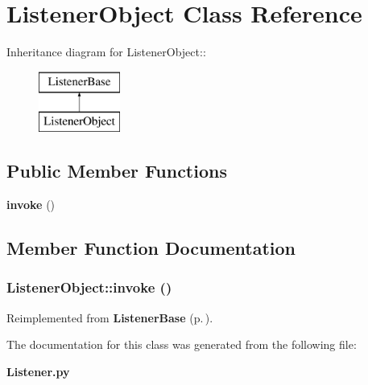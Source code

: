 \section{Listener\-Object Class Reference}
\label{classListenerObject}
Inheritance diagram for Listener\-Object::\begin{figure}[H]
\begin{center}
\leavevmode
\includegraphics[height=2cm]{classListenerObject}
\end{center}
\end{figure}
\subsection*{Public Member Functions}
\begin{CompactItemize}
\item 
{\bf invoke} ()
\end{CompactItemize}


\subsection{Member Function Documentation}
\subsubsection{\setlength{\rightskip}{0pt plus 5cm}Listener\-Object::invoke ()}\label{classListenerObject_ListenerObjecta0}




Reimplemented from {\bf Listener\-Base} {\rm (p.\,\pageref{classListenerBase_ListenerBasea0})}.

The documentation for this class was generated from the following file:\begin{CompactItemize}
\item 
{\bf Listener.py}\end{CompactItemize}

